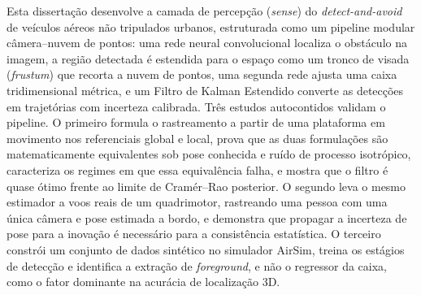 
Esta dissertação desenvolve a camada de percepção (\emph{sense}) do
\emph{detect-and-avoid} de veículos aéreos não tripulados urbanos, estruturada
como um pipeline modular câmera--nuvem de pontos: uma rede neural convolucional
localiza o obstáculo na imagem, a região detectada é estendida para o espaço como
um tronco de visada (\emph{frustum}) que recorta a nuvem de pontos, uma segunda
rede ajusta uma caixa tridimensional métrica, e um Filtro de Kalman Estendido
converte as detecções em trajetórias com incerteza calibrada. Três estudos
autocontidos validam o pipeline. O primeiro formula o rastreamento a partir de
uma plataforma em movimento nos referenciais global e local, prova que as duas
formulações são matematicamente equivalentes sob pose conhecida e ruído de
processo isotrópico, caracteriza os regimes em que essa equivalência falha, e
mostra que o filtro é quase ótimo frente ao limite de Cramér--Rao posterior. O
segundo leva o mesmo estimador a voos reais de um quadrimotor, rastreando uma
pessoa com uma única câmera e pose estimada a bordo, e demonstra que propagar a
incerteza de pose para a inovação é necessário para a consistência estatística.
O terceiro constrói um conjunto de dados sintético no simulador AirSim, treina os
estágios de detecção e identifica a extração de \emph{foreground}, e não o
regressor da caixa, como o fator dominante na acurácia de localização 3D.
